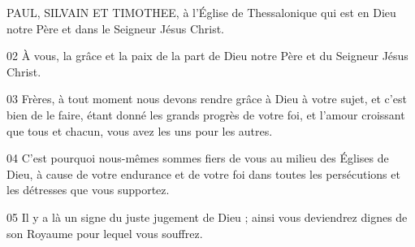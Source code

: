 PAUL, SILVAIN ET TIMOTHEE, à l’Église de Thessalonique qui est en Dieu notre Père et dans le Seigneur Jésus Christ.

02 À vous, la grâce et la paix de la part de Dieu notre Père et du Seigneur Jésus Christ.

03 Frères, à tout moment nous devons rendre grâce à Dieu à votre sujet, et c’est bien de le faire, étant donné les grands progrès de votre foi, et l’amour croissant que tous et chacun, vous avez les uns pour les autres.

04 C’est pourquoi nous-mêmes sommes fiers de vous au milieu des Églises de Dieu, à cause de votre endurance et de votre foi dans toutes les persécutions et les détresses que vous supportez.

05 Il y a là un signe du juste jugement de Dieu ; ainsi vous deviendrez dignes de son Royaume pour lequel vous souffrez.

